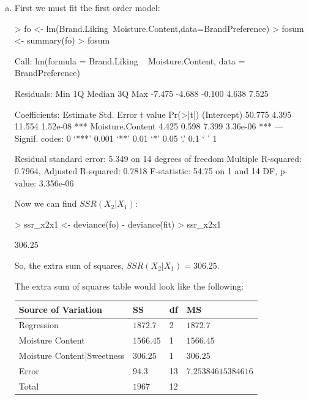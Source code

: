 \documentclass{article}
\begin{document}
\begin{enumerate}[a)]
\item{} First we must fit the first order model:

\begin{Schunk}
\begin{Sinput}
> fo <- lm(Brand.Liking~Moisture.Content,data=BrandPreference)
> fosum <- summary(fo)
> fosum
\end{Sinput}
\begin{Soutput}
Call:
lm(formula = Brand.Liking ~ Moisture.Content, data = BrandPreference)

Residuals:
   Min     1Q Median     3Q    Max 
-7.475 -4.688 -0.100  4.638  7.525 

Coefficients:
                 Estimate Std. Error t value Pr(>|t|)    
(Intercept)        50.775      4.395  11.554 1.52e-08 ***
Moisture.Content    4.425      0.598   7.399 3.36e-06 ***
---
Signif. codes:  0 ‘***’ 0.001 ‘**’ 0.01 ‘*’ 0.05 ‘.’ 0.1 ‘ ’ 1

Residual standard error: 5.349 on 14 degrees of freedom
Multiple R-squared:  0.7964,	Adjusted R-squared:  0.7818 
F-statistic: 54.75 on 1 and 14 DF,  p-value: 3.356e-06
\end{Soutput}
\end{Schunk}

Now we can find $SSR(X_2|X_1)$:

\begin{Schunk}
\begin{Sinput}
> ssr_x2x1 <- deviance(fo) - deviance(fit)
> ssr_x2x1
\end{Sinput}
\begin{Soutput}
[1] 306.25
\end{Soutput}
\end{Schunk}

So, the extra sum of squares, $SSR(X_2|X_1) = 306.25$.

The extra sum of squares table would look like the following:

\begin{tabular}{l l l l}
Source of Variation & SS & df & MS \\ \hline
Regression & $1872.7$ & 2 & $1872.7$ \\
Moisture Content & $1566.45$ & 1 & $1566.45$ \\
Moisture Content|Sweetness & $306.25$ & 1 & $306.25$ \\
Error & $94.3$ & 13 & $7.25384615384616$ \\
Total & $1967$ & 12 \\
\end{tabular}


\end{enumerate}
\end{document}
